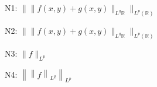 \documentclass{article}
\begin{document}
N1: $\|\|f(x,y)+g(x,y)\|_{L^q{\mathbb{R}}}\|_{L^p(\mathbb{R})}$

N2: $\|{\|f(x,y)+g(x,y)\|_{L^q{\mathbb{R}}}}\|_{L^p(\mathbb{R})}$

N3: $\|f\|_{L^p}$

N4: $\left\|\left\|f\right\|_{L^q}\right\|_{L^p}$
\end{document}

